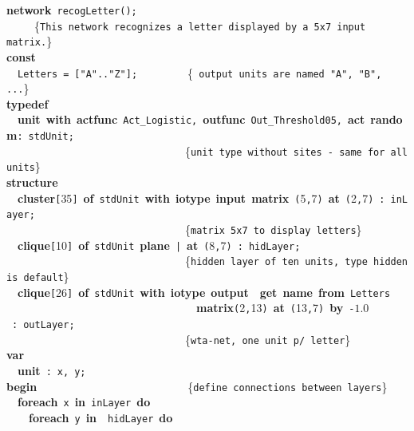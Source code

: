 {\bf network}~\verb&recogLetter&\verb&(&\verb&)&\verb&;&\\
~~~~~{\small \{\verb{This network recognizes a letter displayed by a 5x7 input matrix.{\}}\\[.15cm]
{\bf const}~\\
~~\verb&Letters&~\verb&=&~\verb&[&\verb&"A"&\verb&..&\verb&"Z"&\verb&]&\verb&;&~~~~~~~~~{\small \{\verb{ output units are named "A", "B", ...{\}}\\[.15cm]
{\bf typedef}\\
~~{\bf unit}~{\bf with}~{\bf actfunc}~\verb&Act_Logistic&\verb&,&~{\bf outfunc}~\verb&Out_Threshold05&\verb&,&~{\bf act}~{\bf random}\verb&:&~\verb&stdUnit&\verb&;&\\
~~~~~~~~~~~~~~~~~~~~~~~~~~~~~~~~{\small \{\verb{unit type without sites - same for all units{\}}\\[.15cm]
{\bf structure}\\
~~{\bf cluster}\verb&[&35\verb&]&~{\bf of}~\verb&stdUnit&~{\bf with}~{\bf iotype}~{\bf input}~{\bf matrix}~\verb&(&5\verb&,&7\verb&)&~{\bf at}~\verb&(&2\verb&,&7\verb&)&~\verb&:&~\verb&inLayer&\verb&;&~~~~~\\
~~~~~~~~~~~~~~~~~~~~~~~~~~~~~~~~{\small \{\verb{matrix 5x7 to display letters{\}}\\
~~{\bf clique}\verb&[&10\verb&]&~{\bf of}~\verb&stdUnit&~{\bf plane}~\verb&|&~{\bf at}~\verb&(&8\verb&,&7\verb&)&~\verb&:&~\verb&hidLayer&\verb&;&~~~\\
~~~~~~~~~~~~~~~~~~~~~~~~~~~~~~~~{\small \{\verb{hidden layer of ten units, type hidden is default{\}}\\
~~{\bf clique}\verb&[&26\verb&]&~{\bf of}~\verb&stdUnit&~{\bf with}~{\bf iotype}~{\bf output}~~{\bf get}~{\bf name}~{\bf from}~\verb&Letters&\\
~~~~~~~~~~~~~~~~~~~~~~~~~~~~~~~~~~{\bf matrix}\verb&(&2\verb&,&13\verb&)&~{\bf at}~\verb&(&13\verb&,&7\verb&)&~{\bf by}~\verb&-&$1.0$~\verb&:&~\verb&outLayer&\verb&;&\\
~~~~~~~~~~~~~~~~~~~~~~~~~~~~~~~~{\small \{\verb{wta-net, one unit p/ letter{\}}\\[.15cm]
{\bf var}\\
~~{\bf unit}~\verb&:&~\verb&x&\verb&,&~\verb&y&\verb&;&~\\[.15cm]
{\bf begin}~~~~~~~~~~~~~~~~~~~~~~~~~~~{\small \{\verb{define connections between layers{\}}\\
~~{\bf foreach}~\verb&x&~{\bf in}~\verb&inLayer&~{\bf do}\\
~~~~{\bf foreach}~\verb&y&~{\bf in}~~\verb&hidLayer&~{\bf do}\\
